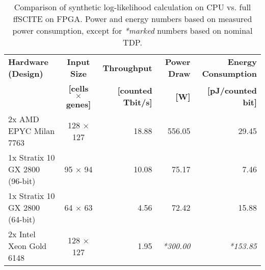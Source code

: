 \begin{table*}[tbh]
    \begin{tabular}{lcrrr}
        \toprule
        \textbf{Hardware (Design)} & \multicolumn{1}{c}{\textbf{Input Size}} & \textbf{Throughput} & \textbf{Power Draw} & \textbf{Energy Consumption}\\
        & \textbf{[cells $\times$ genes]} & \textbf{[counted Tbit/s]} & \textbf{[W]} & \textbf{[pJ/counted bit]}\\
        \cmidrule(r){1-1} \cmidrule(lr){2-2} \cmidrule(r){3-3} \cmidrule(r){4-4} \cmidrule(r){5-5}
        2x AMD EPYC Milan 7763 & 128 $\times$ 127 & 18.88 & 556.05 & 29.45 \\
        1x Stratix 10 GX 2800 (96-bit) & 95 $\times$ 94 & 10.08 & 75.17 & 7.46 \\
        1x Stratix 10 GX 2800 (64-bit) & 64 $\times$ 63 & 4.56 & 72.42 & 15.88 \\
        2x Intel Xeon Gold 6148 & 128 $\times$ 127 & 1.95 & \textit{*300.00} & \textit{*153.85} \\
        \bottomrule
    \end{tabular}
    \caption{Comparison of synthetic log-likelihood calculation on CPU vs. full \ac{ffSCITE} on FPGA.
    Power and energy numbers based on measured power consumption, except for \textit{*marked} numbers based on nominal  TDP.}
    \label{tab:counted_bits}
\end{table*}

